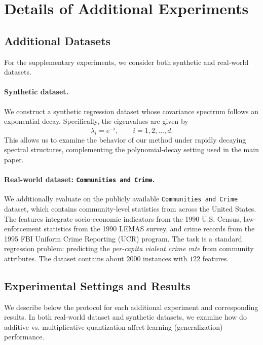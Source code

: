 \documentclass[11pt, letterpaper]{article}
\begin{document}
\section{Details of Additional Experiments}
\label{sec: exp}

\subsection{Additional Datasets}

For the supplementary experiments, we consider both synthetic and real-world datasets.

\paragraph{Synthetic dataset.}
We construct a synthetic regression dataset whose covariance spectrum follows an exponential decay. Specifically, the eigenvalues are given by
\[
    \lambda_i = e^{-i}, \qquad i = 1,2,\dots,d.
\]
This allows us to examine the behavior of our method under rapidly decaying spectral structures, complementing the polynomial-decay setting used in the main paper.

\paragraph{Real-world dataset: \texttt{Communities and Crime}.}
We additionally evaluate on the publicly available \texttt{Communities and Crime} dataset, which contains community-level statistics from across the United States. The features integrate socio-economic indicators from the 1990 U.S. Census, law-enforcement statistics from the 1990 LEMAS survey, and crime records from the 1995 FBI Uniform Crime Reporting (UCR) program.  
The task is a standard regression problem: predicting the \emph{per-capita violent crime rate} from community attributes. The dataset contains about $2000$ instances with $122$ features.

\subsection{Experimental Settings and Results}

We describe below the protocol for each additional experiment and corresponding results. In both real-world dataset and synthetic datasets, we examine how do additive vs. multiplicative quantization affect learning (generalization) performance.
\end{document}
